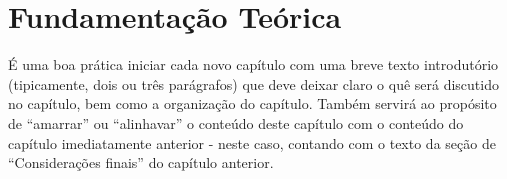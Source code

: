 
\chapter{Fundamentação Teórica}
\label{chap:fundamentacao_teorica}

É uma boa prática iniciar cada novo capítulo com uma breve texto introdutório (tipicamente, dois ou três parágrafos) que deve deixar claro o quê será discutido no capítulo, bem como a organização do capítulo.
Também servirá ao propósito de ``amarrar'' ou ``alinhavar'' o conteúdo deste capítulo com o conteúdo do capítulo imediatamente anterior - neste caso, contando com o texto da seção de ``Considerações finais'' do capítulo anterior.
